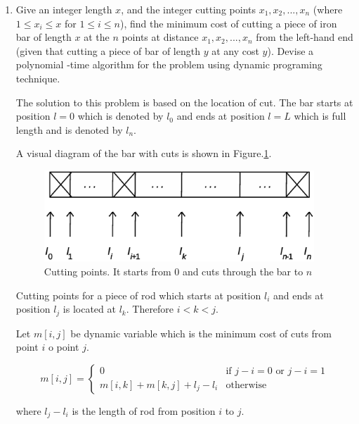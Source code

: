 \documentclass[11pt]{article}
\begin{document}
\begin{enumerate}

\itemsep 0.35in



\item Give an integer length $x$, and the integer cutting points $x_1,x_2,...,x_n$ (where $1 \leq x_i \leq x$ for $1\leq i \leq n$), find the minimum cost of cutting a piece of iron bar of length $x$ at the $n$ points at distance $x_1,x_2,...,x_n$ from the left-hand end (given that cutting a piece of bar of length $y$ at any cost $y$). Devise a polynomial -time algorithm for the problem using dynamic programing technique.  
	
	The solution to this problem is based on the location of cut. The bar starts at position $l=0$ which is denoted by $l_0$ and ends at position $l=L$ which is full length  and is denoted by $l_n$. 
	
	A visual diagram of the bar with cuts is shown in Figure.\ref{fig:bar_partition}.
        
    \begin{figure}[h!]
		\centerline{\includegraphics[width=4in]{bar_partition.eps}}
		\caption{Cutting points. It starts from 0 and cuts through the bar to $n$}
		\label{fig:bar_partition}
	\end{figure}
	
	Cutting points for a piece of rod which starts at position $l_i$ and ends at position $l_j$ is located at $l_k$. Therefore $i<k<j$. 
	
	Let $m[i,j]$ be dynamic variable which is the minimum cost of cuts from point $i$ o point $j$.
	
	\begin{equation}
	m[i,j] =
    	\begin{cases}
      	0 & \text{if $j-i=0$ or $j-i=1$}\\
      	m[i,k]+m[k,j]+l_j-l_i & \text{otherwise}
    	\end{cases}       
	\end{equation}
	
	where $l_j-l_i$ is the length of rod from position $i$ to $j$. 
	

\end{enumerate}
\end{document}
